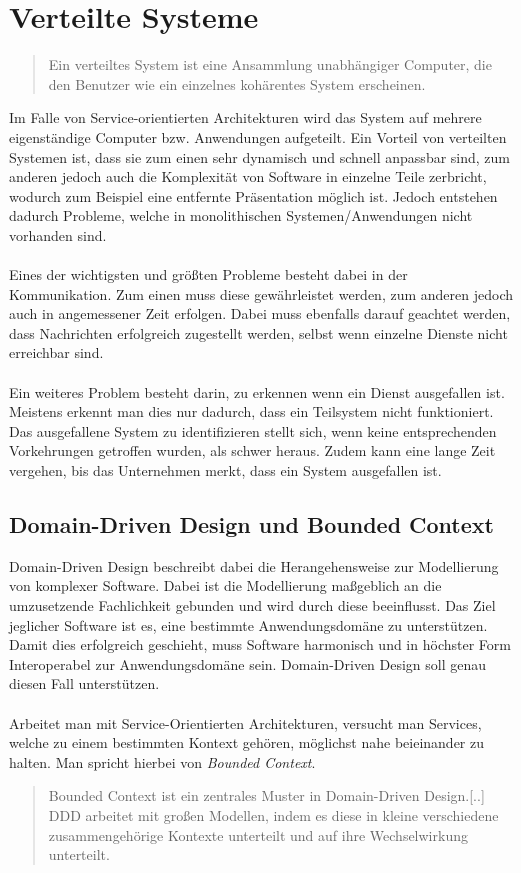 \section{Verteilte Systeme}
\label{sec:VerteilteAnwendungen}
\begin{quotation}
    \frqq Ein verteiltes System ist eine Ansammlung unabhängiger Computer, die den Benutzer wie ein einzelnes kohärentes System erscheinen.\flqq\cite[S. 19]{tanenbaum:VerteilteSysteme}
\end{quotation}
Im Falle von Service-orientierten Architekturen wird das System auf mehrere eigenständige Computer bzw. Anwendungen aufgeteilt. Ein Vorteil von verteilten Systemen ist, dass sie zum einen sehr dynamisch und schnell anpassbar sind, zum anderen jedoch auch die Komplexität von Software in einzelne Teile zerbricht, wodurch zum Beispiel eine entfernte Präsentation möglich ist.
Jedoch entstehen dadurch Probleme, welche in monolithischen Systemen/Anwendungen nicht vorhanden sind.
\\\\
Eines der wichtigsten und größten Probleme besteht dabei in der Kommunikation. Zum einen muss diese gewährleistet werden, zum anderen jedoch auch in angemessener Zeit erfolgen. Dabei muss ebenfalls darauf geachtet werden, dass Nachrichten erfolgreich zugestellt werden, selbst wenn einzelne Dienste nicht erreichbar sind.
\\\\
Ein weiteres Problem besteht darin, zu erkennen wenn ein Dienst ausgefallen ist. Meistens erkennt man dies nur dadurch, dass ein Teilsystem nicht funktioniert. Das ausgefallene System zu identifizieren stellt sich, wenn keine entsprechenden Vorkehrungen getroffen wurden, als schwer heraus. Zudem kann eine lange Zeit vergehen, bis das Unternehmen merkt, dass ein System ausgefallen ist.

\subsection{Domain-Driven Design und Bounded Context}
\label{sec:boundedContext}
Domain-Driven Design beschreibt dabei die Herangehensweise zur Modellierung von komplexer Software. Dabei ist die Modellierung maßgeblich an die umzusetzende Fachlichkeit gebunden und wird durch diese beeinflusst. Das Ziel jeglicher Software ist es, eine bestimmte Anwendungsdomäne zu unterstützen. Damit dies erfolgreich geschieht, muss Software harmonisch und in höchster Form Interoperabel zur Anwendungsdomäne sein. Domain-Driven Design soll genau diesen Fall unterstützen.
\\\\
Arbeitet man mit Service-Orientierten Architekturen, versucht man Services, welche zu einem bestimmten Kontext gehören, möglichst nahe beieinander zu halten. Man spricht hierbei von \textit{Bounded Context}. 
\begin{quotation}
    \frqq Bounded Context ist ein zentrales Muster in Domain-Driven Design.[..] DDD arbeitet mit großen Modellen, indem es diese in kleine verschiedene zusammengehörige Kontexte unterteilt und auf ihre Wechselwirkung unterteilt.\flqq \cite{mfowler:BoundedContext}
\end{quotation}

